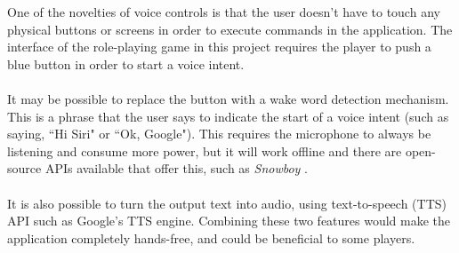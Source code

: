 \documentclass[11pt]{article}
\begin{document}
One of the novelties of voice controls is that the user doesn't have to touch any physical buttons or screens in order to execute commands in the application. The interface of the role-playing game in this project requires the player to push a blue button in order to start a voice intent.
\\
\\
It may be possible to replace the button with a wake word detection mechanism. This is a phrase that the user says to indicate the start of a voice intent (such as saying, ``Hi Siri" or ``Ok, Google"). This requires the microphone to always be listening and consume more power, but it will work offline and there are open-source APIs available that offer this, such as \textit{Snowboy} \cite{RefWorks:133}.
\\
\\
It is also possible to turn the output text into audio, using text-to-speech (TTS) API such as Google's TTS engine. Combining these two features would make the application completely hands-free, and could be beneficial to some players.
\end{document}
